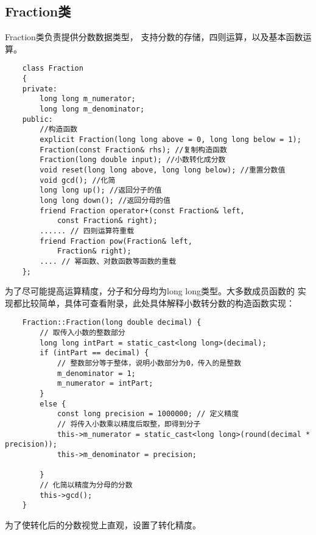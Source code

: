 \subsection{Fraction类}
Fraction类负责提供分数数据类型，
支持分数的存储，四则运算，以及基本函数运算。
\begin{lstlisting}
    class Fraction
    {
    private:
        long long m_numerator;
        long long m_denominator;
    public:
        //构造函数
        explicit Fraction(long long above = 0, long long below = 1); 
        Fraction(const Fraction& rhs); //复制构造函数
        Fraction(long double input); //小数转化成分数
        void reset(long long above, long long below); //重置分数值
        void gcd(); //化简
        long long up(); //返回分子的值
        long long down(); //返回分母的值
        friend Fraction operator+(const Fraction& left, 
            const Fraction& right);
        ...... // 四则运算符重载
        friend Fraction pow(Fraction& left, 
            Fraction& right);
        .... // 幂函数、对数函数等函数的重载
    };    
\end{lstlisting}
为了尽可能提高运算精度，分子和分母均为long long类型。大多数成员函数的
实现都比较简单，具体可查看附录，此处具体解释小数转分数的构造函数实现：
\begin{lstlisting}
    Fraction::Fraction(long double decimal) {
        // 取传入小数的整数部分
        long long intPart = static_cast<long long>(decimal);
        if (intPart == decimal) {
            // 整数部分等于整体，说明小数部分为0，传入的是整数
            m_denominator = 1;
            m_numerator = intPart;
        }
        else {
            const long precision = 1000000; // 定义精度
            // 将传入小数乘以精度后取整，即得到分子
            this->m_numerator = static_cast<long long>(round(decimal * precision));
            this->m_denominator = precision;
    
        }
        // 化简以精度为分母的分数
        this->gcd();
    }
\end{lstlisting}
为了使转化后的分数视觉上直观，设置了转化精度。



